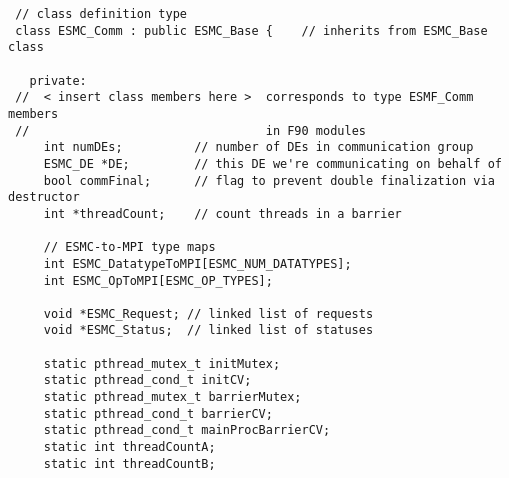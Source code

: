 
\begin{verbatim}
 // class definition type
 class ESMC_Comm : public ESMC_Base {    // inherits from ESMC_Base class

   private:
 //  < insert class members here >  corresponds to type ESMF_Comm members
 //                                 in F90 modules
     int numDEs;          // number of DEs in communication group
     ESMC_DE *DE;         // this DE we're communicating on behalf of
     bool commFinal;      // flag to prevent double finalization via destructor
     int *threadCount;    // count threads in a barrier

     // ESMC-to-MPI type maps
     int ESMC_DatatypeToMPI[ESMC_NUM_DATATYPES];
     int ESMC_OpToMPI[ESMC_OP_TYPES];

     void *ESMC_Request; // linked list of requests
     void *ESMC_Status;  // linked list of statuses

     static pthread_mutex_t initMutex;
     static pthread_cond_t initCV;
     static pthread_mutex_t barrierMutex;
     static pthread_cond_t barrierCV;
     static pthread_cond_t mainProcBarrierCV;
     static int threadCountA;
     static int threadCountB;
\end{verbatim}
